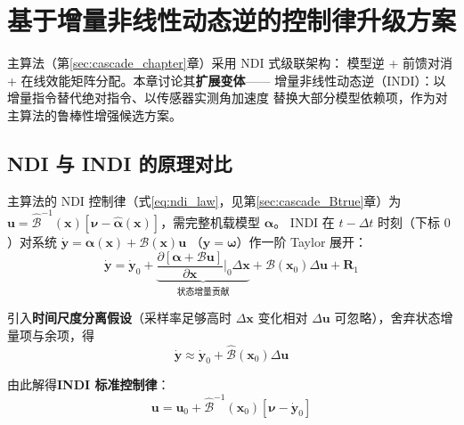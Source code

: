 
\section{基于增量非线性动态逆的控制律升级方案}
\label{sec:INDI}

主算法（第\ref{sec:cascade_chapter}章）采用 NDI 式级联架构：
模型逆 + 前馈对消 + 在线效能矩阵分配。本章讨论其\textbf{扩展变体}——
增量非线性动态逆（INDI）：以增量指令替代绝对指令、以传感器实测角加速度
替换大部分模型依赖项，作为对主算法的鲁棒性增强候选方案。

\subsection{NDI 与 INDI 的原理对比}

主算法的 NDI 控制律（式\ref{eq:ndi_law}，见第\ref{sec:cascade_Btrue}章）为
$\mathbf{u} = \hat{\mathcal{B}}^{-1}(\mathbf{x})[\boldsymbol{\nu} -
\hat{\boldsymbol{\alpha}}(\mathbf{x})]$，需完整机载模型 $\hat{\boldsymbol{\alpha}}$。
INDI 在 $t-\Delta t$ 时刻（下标 $0$）对系统
$\dot{\mathbf{y}} = \boldsymbol{\alpha}(\mathbf{x}) + \mathcal{B}(\mathbf{x})\mathbf{u}$
（$\mathbf{y}=\boldsymbol{\omega}$）作一阶 Taylor 展开\cite{sieberling2010robust,pollack2023robust}：
\begin{equation}
    \dot{\mathbf{y}} = \dot{\mathbf{y}}_0 + \underbrace{\frac{\partial[\boldsymbol{\alpha}+\mathcal{B}\mathbf{u}]}{\partial\mathbf{x}}\Big|_0 \Delta\mathbf{x}}_{\text{状态增量贡献}} + \mathcal{B}(\mathbf{x}_0)\Delta\mathbf{u} + \mathbf{R}_1
    \label{eq:indi_taylor}
\end{equation}

引入\textbf{时间尺度分离假设}（采样率足够高时 $\Delta\mathbf{x}$ 变化相对
$\Delta\mathbf{u}$ 可忽略），舍弃状态增量项与余项，得
\begin{equation}
    \dot{\mathbf{y}} \approx \dot{\mathbf{y}}_0 + \hat{\mathcal{B}}(\mathbf{x}_0)\Delta\mathbf{u}
    \label{eq:indi_simplified}
\end{equation}

由此解得\textbf{INDI 标准控制律}：
\begin{equation}
    \boxed{\mathbf{u} = \mathbf{u}_0 + \hat{\mathcal{B}}^{-1}(\mathbf{x}_0)\left[\boldsymbol{\nu} - \dot{\mathbf{y}}_0\right]}
    \label{eq:indi_law}
\end{equation}

